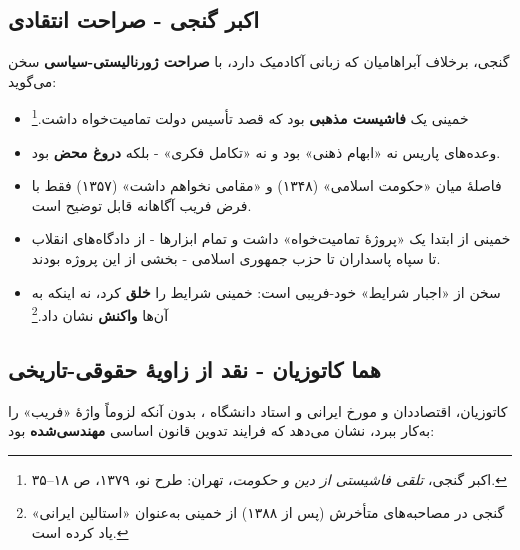 \documentclass[12pt,a4paper]{book}
\newcommand{\keyword}[1]{\textbf{\textcolor{cPrimary}{#1}}}
\newcommand{\en}[1]{\lr{\textit{#1}}}
\begin{document}
\subsection{اکبر گنجی - صراحت انتقادی}

گنجی، برخلاف آبراهامیان که زبانی آکادمیک دارد، با \keyword{صراحت ژورنالیستی-سیاسی} سخن می‌گوید:

\begin{warningBox}
\begin{itemize}[label=\textcolor{cAccent}{$\bullet$}, rightmargin=2em]
    \item خمینی یک \keyword{فاشیست مذهبی} بود که قصد تأسیس دولت تمامیت‌خواه داشت.\footnote{اکبر گنجی، \textit{تلقی فاشیستی از دین و حکومت}، تهران: طرح نو، ۱۳۷۹، ص ۱۸–۳۵.}
    \item وعده‌های پاریس نه «ابهام ذهنی» بود و نه «تکامل فکری» - بلکه \keyword{دروغ محض} بود.
    \item فاصلهٔ میان «حکومت اسلامی» (۱۳۴۸) و «مقامی نخواهم داشت» (۱۳۵۷) فقط با فرض فریب آگاهانه قابل توضیح است.
    \item خمینی از ابتدا یک «پروژهٔ تمامیت‌خواه» داشت و تمام ابزارها - از دادگاه‌های انقلاب تا سپاه پاسداران تا حزب جمهوری اسلامی - بخشی از این پروژه بودند.
    \item سخن از «اجبار شرایط» خود-فریبی است: خمینی شرایط را \keyword{خلق} کرد، نه اینکه به آن‌ها \keyword{واکنش} نشان داد.\footnote{گنجی در مصاحبه‌های متأخرش (پس از ۱۳۸۸) از خمینی به‌عنوان «استالین ایرانی» یاد کرده است.}
\end{itemize}
\end{warningBox}

\subsection{هما کاتوزیان - نقد از زاویهٔ حقوقی-تاریخی}

کاتوزیان، اقتصاددان و مورخ ایرانی و استاد دانشگاه \en{Oxford}، بدون آنکه لزوماً واژهٔ «فریب» را به‌کار ببرد، نشان می‌دهد که فرایند تدوین قانون اساسی \keyword{مهندسی‌شده} بود:
\end{document}
